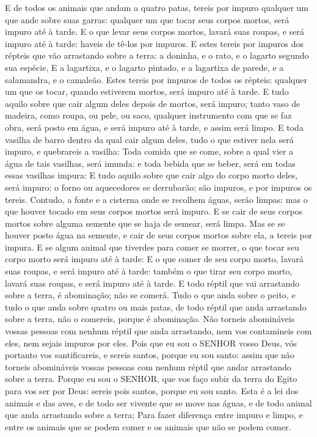 {E de todos os animais que andam a quatro patas, tereis por impuro qualquer um que ande sobre suas garras: qualquer um que tocar seus corpos mortos, será impuro até à tarde.
E o que levar seus corpos mortos, lavará suas roupas, e será impuro até à tarde: haveis de tê-los por impuros.
E estes tereis por impuros dos répteis que vão arrastando sobre a terra: a doninha, e o rato, e o lagarto segundo sua espécie,
E a lagartixa, e o lagarto pintado, e a lagartixa de parede, e a salamandra, e o camaleão.
Estes tereis por impuros de todos os répteis: qualquer um que os tocar, quando estiverem mortos, será impuro até à tarde.
E tudo aquilo sobre que cair algum deles depois de mortos, será impuro; tanto vaso de madeira, como roupa, ou pele, ou saco, qualquer instrumento com que se faz obra, será posto em água, e será impuro até à tarde, e assim será limpo.
E toda vasilha de barro dentro da qual cair algum deles, tudo o que estiver nela será impuro, e quebrareis a vasilha:
Toda comida que se come, sobre a qual vier a água de tais vasilhas, será imunda: e toda bebida que se beber, será em todas essas vasilhas impura:
E tudo aquilo sobre que cair algo do corpo morto deles, será impuro: o forno ou aquecedores se derrubarão; são impuros, e por impuros os tereis.
Contudo, a fonte e a cisterna onde se recolhem águas, serão limpas: mas o que houver tocado em seus corpos mortos será impuro.
E se cair de seus corpos mortos sobre alguma semente que se haja de semear, será limpa.
Mas se se houver posto água na semente, e cair de seus corpos mortos sobre ela, a tereis por impura.
E se algum animal que tiverdes para comer se morrer, o que tocar seu corpo morto será impuro até à tarde:
E o que comer de seu corpo morto, lavará suas roupas, e será impuro até à tarde: também o que tirar seu corpo morto, lavará suas roupas, e será impuro até à tarde.
E todo réptil que vai arrastando sobre a terra, é abominação; não se comerá.
Tudo o que anda sobre o peito, e tudo o que anda sobre quatro ou mais patas, de todo réptil que anda arrastando sobre a terra, não o comereis, porque é abominação.
Não torneis abomináveis vossas pessoas com nenhum réptil que anda arrastando, nem vos contamineis com eles, nem sejais impuros por eles.
Pois que eu sou o SENHOR vosso Deus, vós portanto vos santificareis, e sereis santos, porque eu sou santo: assim que não torneis abomináveis vossas pessoas com nenhum réptil que andar arrastando sobre a terra.
Porque eu sou o SENHOR, que vos faço subir da terra do Egito para vos ser por Deus: sereis pois santos, porque eu sou santo.
Esta é a lei dos animais e das aves, e de todo ser vivente que se move nas águas, e de todo animal que anda arrastando sobre a terra;
Para fazer diferença entre impuro e limpo, e entre os animais que se podem comer e os animais que não se podem comer.

}
